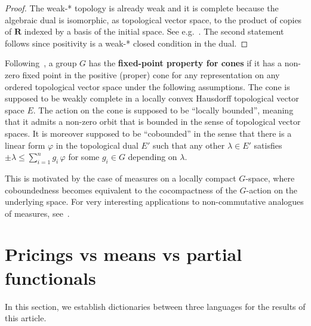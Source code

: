 \documentclass[11pt]{amsart}
\numberwithin{equation}{section}
\theoremstyle{definition}
\theoremstyle{definition}
\newcommand*{\RR}{\mathbf{R}}
\begin{document}
\begin{proof}
The weak-* topology is already weak and it is complete because the algebraic dual is isomorphic, as topological vector space, to the product of copies of $\RR$ indexed by a basis of the initial space. See e.g.~\cite[II \S\,6 No.\,6--7]{BourbakiEVT81}. The second statement follows since positivity is a weak-* closed condition in the dual.
\end{proof}

Following~\cite{Monod_cones}, a group $G$ has the \textbf{fixed-point property for cones} if it has a non-zero fixed point in the positive (proper) cone for any representation on any ordered topological vector space under the following assumptions. The cone is supposed to be weakly complete in a locally convex Hausdorff topological vector space $E$. The action on the cone is supposed to be ``locally bounded'', meaning that it admits a non-zero orbit that is bounded in the sense of topological vector spaces. It is moreover supposed to be ``cobounded'' in the sense that there is a linear form $\varphi$ in the topological dual $E'$ such that any other $\lambda\in E'$ satisfies $\pm \lambda \leq \sum_{i=1}^n g_i\, \varphi$ for some $g_i\in G$ depending on $\lambda$.

This is motivated by the case of measures on a locally compact $G$-space, where coboundedness becomes equivalent to the cocompactness of the $G$-action on the underlying space. For very interesting applications to non-commutative analogues of measures, see~\cite{Rordam2019}.


\section{Pricings vs means vs partial functionals}\label{sec:PPP}%
In this section, we establish dictionaries between three languages for the results of this article.
\end{document}

